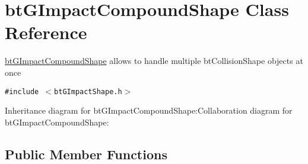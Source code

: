 \hypertarget{classbt_g_impact_compound_shape}{
\section{btGImpactCompoundShape Class Reference}
\label{classbt_g_impact_compound_shape}
}
\hyperlink{classbt_g_impact_compound_shape}{btGImpactCompoundShape} allows to handle multiple btCollisionShape objects at once  


{\tt \#include $<$btGImpactShape.h$>$}

Inheritance diagram for btGImpactCompoundShape:Collaboration diagram for btGImpactCompoundShape:\subsection*{Public Member Functions}
